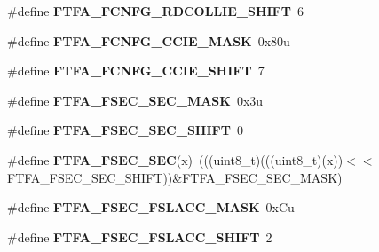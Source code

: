 \begin{DoxyCompactItemize}
\item 
\mbox{\label{group___f_t_f_a___register___masks_gaea7f60637733465718c684ca9c4612f6}} 
\#define {\bfseries F\+T\+F\+A\+\_\+\+F\+C\+N\+F\+G\+\_\+\+R\+D\+C\+O\+L\+L\+I\+E\+\_\+\+S\+H\+I\+FT}~6
\item 
\mbox{\label{group___f_t_f_a___register___masks_gad7b9ee7d7ca0f897784ed211030e6e8f}} 
\#define {\bfseries F\+T\+F\+A\+\_\+\+F\+C\+N\+F\+G\+\_\+\+C\+C\+I\+E\+\_\+\+M\+A\+SK}~0x80u
\item 
\mbox{\label{group___f_t_f_a___register___masks_ga7032f590fbfc9a43d13109688eb3a4c0}} 
\#define {\bfseries F\+T\+F\+A\+\_\+\+F\+C\+N\+F\+G\+\_\+\+C\+C\+I\+E\+\_\+\+S\+H\+I\+FT}~7
\item 
\mbox{\label{group___f_t_f_a___register___masks_ga3f0ba5e4a511479878b0505bc098ec00}} 
\#define {\bfseries F\+T\+F\+A\+\_\+\+F\+S\+E\+C\+\_\+\+S\+E\+C\+\_\+\+M\+A\+SK}~0x3u
\item 
\mbox{\label{group___f_t_f_a___register___masks_ga0c7032c13efe05ed6c6d86c42beb7a5f}} 
\#define {\bfseries F\+T\+F\+A\+\_\+\+F\+S\+E\+C\+\_\+\+S\+E\+C\+\_\+\+S\+H\+I\+FT}~0
\item 
\mbox{\label{group___f_t_f_a___register___masks_gacb0f50c64228c78ff70896ffa68ec797}} 
\#define {\bfseries F\+T\+F\+A\+\_\+\+F\+S\+E\+C\+\_\+\+S\+EC}(x)~(((uint8\+\_\+t)(((uint8\+\_\+t)(x))$<$$<$F\+T\+F\+A\+\_\+\+F\+S\+E\+C\+\_\+\+S\+E\+C\+\_\+\+S\+H\+I\+FT))\&F\+T\+F\+A\+\_\+\+F\+S\+E\+C\+\_\+\+S\+E\+C\+\_\+\+M\+A\+SK)
\item 
\mbox{\label{group___f_t_f_a___register___masks_gac14ea09f287d879b663b0a592c330ec0}} 
\#define {\bfseries F\+T\+F\+A\+\_\+\+F\+S\+E\+C\+\_\+\+F\+S\+L\+A\+C\+C\+\_\+\+M\+A\+SK}~0x\+Cu
\item 
\mbox{\label{group___f_t_f_a___register___masks_ga1cb7f2755cb290524e1dbb662893582c}} 
\#define {\bfseries F\+T\+F\+A\+\_\+\+F\+S\+E\+C\+\_\+\+F\+S\+L\+A\+C\+C\+\_\+\+S\+H\+I\+FT}~2
$$
\end{DoxyCompactItemize}
